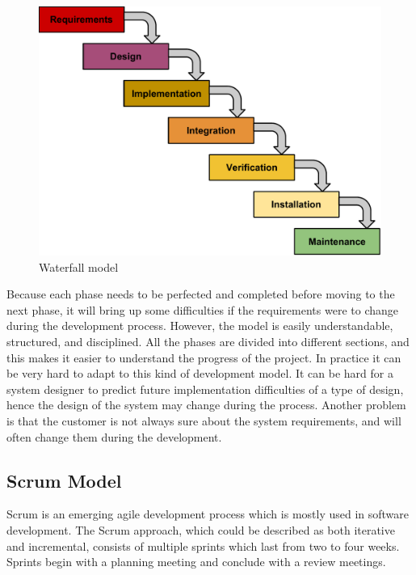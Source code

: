 \begin{figure}[h]
\begin{center}
\includegraphics[scale=0.6]{../Figures/Waterfall-model.pdf}
\end{center}
\caption{Waterfall model}
\label{figure:waterfall-model}
\end{figure}

Because each phase needs to be perfected and completed before moving to the next phase, it will bring up some difficulties if the requirements were to change during the development process. 
However, the model is easily understandable, structured, and disciplined. 
All the phases are divided into different sections, and this makes it easier to understand the progress of the project.
In practice it can be very hard to adapt to this kind of development model. 
It can be hard for a system designer to predict future implementation difficulties of a type of design, hence the design of the system may change during the process.
Another problem is that the customer is not always sure about the system requirements, and will often change them during the development.

\subsection{Scrum Model} \nocite{Compendium}

Scrum is an emerging agile development process which is mostly used in software development.
The Scrum approach, which could be described as both iterative and incremental, consists of multiple sprints
which last from two to four weeks. Sprints begin with a planning meeting and conclude with a review meetings.

